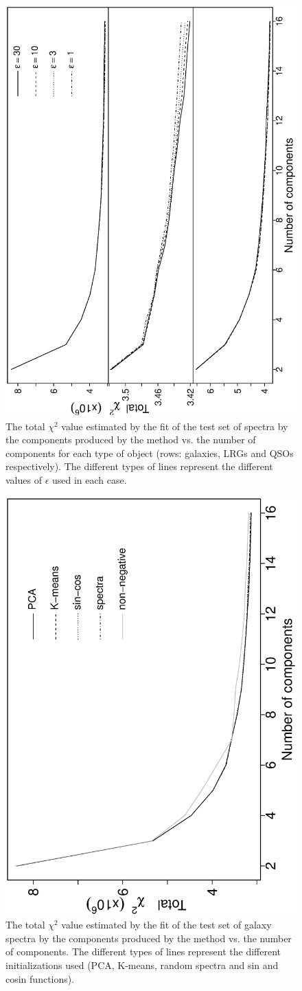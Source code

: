 \documentclass[12pt,preprint]{aastex}
\begin{document}
\clearpage
\begin{figure}
\includegraphics[angle=-90,width=0.49\columnwidth]{paper_plots/fig5}
\caption{The total $\chi^2$ value estimated by the fit of the test set
  of spectra by the components produced by the method vs. the number
  of components for each type of object (rows: galaxies, LRGs and QSOs
  respectively). The different types of lines represent the different
  values of $\epsilon$ used in each case.}
\label{fig:3}
\end{figure}

\clearpage
\begin{figure}
\includegraphics[angle=-90,width=0.49\columnwidth]{paper_plots/fig6}
\caption{The total $\chi^2$ value estimated by the fit of the test set
  of galaxy spectra by the components produced by the method vs. the
  number of components. The different types of lines represent the
  different initializations used (PCA, K-means, random spectra and sin
  and cosin functions).}
\label{fig:4}
\end{figure}
\end{document}
